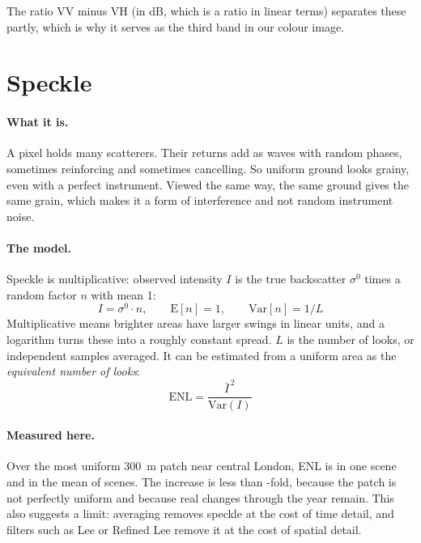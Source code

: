 \medskip\noindent The ratio VV minus VH (in dB, which is a ratio in linear terms) separates these partly, which is why it serves as the third band in our colour image.

\section{Speckle}
\paragraph{What it is.} A pixel holds many scatterers. Their returns add as waves with random phases, sometimes reinforcing and sometimes cancelling. So uniform ground looks grainy, even with a perfect instrument. Viewed the same way, the same ground gives the same grain, which makes it a form of interference and not random instrument noise.

\paragraph{The model.} Speckle is multiplicative: observed intensity $I$ is the true backscatter $\sigma^0$ times a random factor $n$ with mean 1:
\begin{equation}
I = \sigma^0 \cdot n, \qquad \mathrm{E}[n]=1, \qquad \mathrm{Var}[n] = 1/L
\end{equation}
Multiplicative means brighter areas have larger swings in linear units, and a logarithm turns these into a roughly constant spread. $L$ is the number of looks, or independent samples averaged. It can be estimated from a uniform area as the \emph{equivalent number of looks}:
\begin{equation}
\mathrm{ENL} = \frac{\bar{I}^{\,2}}{\mathrm{Var}(I)}
\end{equation}

\paragraph{Measured here.} Over the most uniform 300~m patch near central London, ENL is \enlOne{} in one scene and \enlMany{} in the mean of \nScenesLondon{} scenes. The increase is less than \nScenesLondon{}-fold, because the patch is not perfectly uniform and because real changes through the year remain. This also suggests a limit: averaging removes speckle at the cost of time detail, and filters such as Lee or Refined Lee remove it at the cost of spatial detail.

